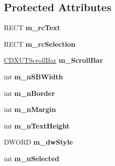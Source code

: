 \subsection*{Protected Attributes}
\begin{DoxyCompactItemize}
\item 
\hypertarget{class_c_d_x_u_t_list_box_a2dea32bd9a82138ae549084e74b030ef}{R\+E\+C\+T {\bfseries m\+\_\+rc\+Text}}\label{class_c_d_x_u_t_list_box_a2dea32bd9a82138ae549084e74b030ef}

\item 
\hypertarget{class_c_d_x_u_t_list_box_a57972e758fd19f1cd23c9e9bc41745c7}{R\+E\+C\+T {\bfseries m\+\_\+rc\+Selection}}\label{class_c_d_x_u_t_list_box_a57972e758fd19f1cd23c9e9bc41745c7}

\item 
\hypertarget{class_c_d_x_u_t_list_box_a927146f380016cfc8b580b6f540648aa}{\hyperlink{class_c_d_x_u_t_scroll_bar}{C\+D\+X\+U\+T\+Scroll\+Bar} {\bfseries m\+\_\+\+Scroll\+Bar}}\label{class_c_d_x_u_t_list_box_a927146f380016cfc8b580b6f540648aa}

\item 
\hypertarget{class_c_d_x_u_t_list_box_a30975b84ea9afb7aa63c4572579b8e42}{int {\bfseries m\+\_\+n\+S\+B\+Width}}\label{class_c_d_x_u_t_list_box_a30975b84ea9afb7aa63c4572579b8e42}

\item 
\hypertarget{class_c_d_x_u_t_list_box_a1e089c11156f403da3af68a1e1766363}{int {\bfseries m\+\_\+n\+Border}}\label{class_c_d_x_u_t_list_box_a1e089c11156f403da3af68a1e1766363}

\item 
\hypertarget{class_c_d_x_u_t_list_box_ae7d0e16e914553aaac60138bd4728b15}{int {\bfseries m\+\_\+n\+Margin}}\label{class_c_d_x_u_t_list_box_ae7d0e16e914553aaac60138bd4728b15}

\item 
\hypertarget{class_c_d_x_u_t_list_box_af21c0d22f870efc2575a16941f0c400a}{int {\bfseries m\+\_\+n\+Text\+Height}}\label{class_c_d_x_u_t_list_box_af21c0d22f870efc2575a16941f0c400a}

\item 
\hypertarget{class_c_d_x_u_t_list_box_a0d9213ef6a8785539a01a54720163813}{D\+W\+O\+R\+D {\bfseries m\+\_\+dw\+Style}}\label{class_c_d_x_u_t_list_box_a0d9213ef6a8785539a01a54720163813}

\item 
\hypertarget{class_c_d_x_u_t_list_box_aa9e2d7803e0006547b19e2cd10e73975}{int {\bfseries m\+\_\+n\+Selected}}\label{class_c_d_x_u_t_list_box_aa9e2d7803e0006547b19e2cd10e73975}


\end{DoxyCompactItemize}
